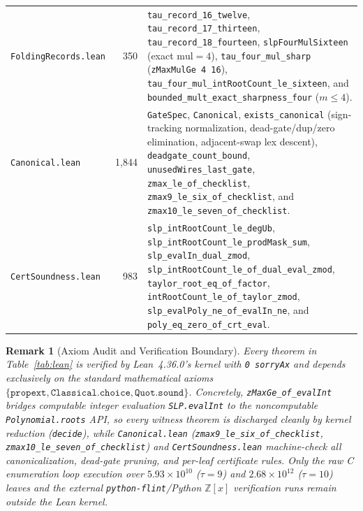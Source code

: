 \documentclass[11pt]{article}
\newtheorem{remark}[theorem]{Remark}
\newcommand{\Z}{\mathbb{Z}}
\newcommand{\code}[1]{\texttt{#1}}
\begin{document}
\begin{table}[ht]
\begin{tabularx}{\textwidth}{@{}l r X@{}}
\addlinespace[3pt]
\code{FoldingRecords.lean} & 350 &
\code{tau\_record\_16\_twelve}, \code{tau\_record\_17\_thirteen}, \code{tau\_record\_18\_fourteen}, \code{slpFourMulSixteen} (exact $\mathrm{mul}=4$), \code{tau\_four\_mul\_sharp} (\code{zMaxMulGe 4 16}), \code{tau\_four\_mul\_intRootCount\_le\_sixteen}, and \code{bounded\_mult\_exact\_sharpness\_four} ($m \le 4$). \\
\addlinespace[3pt]
\code{Canonical.lean} & 1,844 &
\code{GateSpec}, \code{Canonical}, \code{exists\_canonical} (sign-tracking normalization, dead-gate/dup/zero elimination, adjacent-swap lex descent), \code{deadgate\_count\_bound}, \code{unusedWires\_last\_gate}, \code{zmax\_le\_of\_checklist}, \code{zmax9\_le\_six\_of\_checklist}, and \code{zmax10\_le\_seven\_of\_checklist}. \\
\addlinespace[3pt]
\code{CertSoundness.lean} & 983 &
\code{slp\_intRootCount\_le\_degUb}, \code{slp\_intRootCount\_le\_prodMask\_sum}, \code{slp\_evalIn\_dual\_zmod}, \code{slp\_intRootCount\_le\_of\_dual\_eval\_zmod}, \code{taylor\_root\_eq\_of\_factor}, \code{intRootCount\_le\_of\_taylor\_zmod}, \code{slp\_evalPoly\_ne\_of\_evalIn\_ne}, and \code{poly\_eq\_zero\_of\_crt\_eval}. \\
\bottomrule
\end{tabularx}
\end{table}

\begin{remark}[Axiom Audit and Verification Boundary]
Every theorem in Table~\ref{tab:lean} is verified by Lean~4.36.0's kernel with \code{0 sorryAx} and depends exclusively on the standard mathematical axioms $\{\code{propext}, \code{Classical.choice}, \code{Quot.sound}\}$. Concretely, \code{zMaxGe\_of\_evalInt} bridges computable integer evaluation \code{SLP.evalInt} to the noncomputable \code{Polynomial.roots} API, so every witness theorem is discharged cleanly by kernel reduction (\code{decide}), while \code{Canonical.lean} (\code{zmax9\_le\_six\_of\_checklist}, \code{zmax10\_le\_seven\_of\_checklist}) and \code{CertSoundness.lean} machine-check all canonicalization, dead-gate pruning, and per-leaf certificate rules. Only the raw C enumeration loop execution over $5.93 \times 10^{10}$ ($\tau=9$) and $2.68 \times 10^{12}$ ($\tau=10$) leaves and the external \code{python-flint}/Python $\Z[x]$ verification runs remain outside the Lean kernel.
\end{remark}
\end{document}
